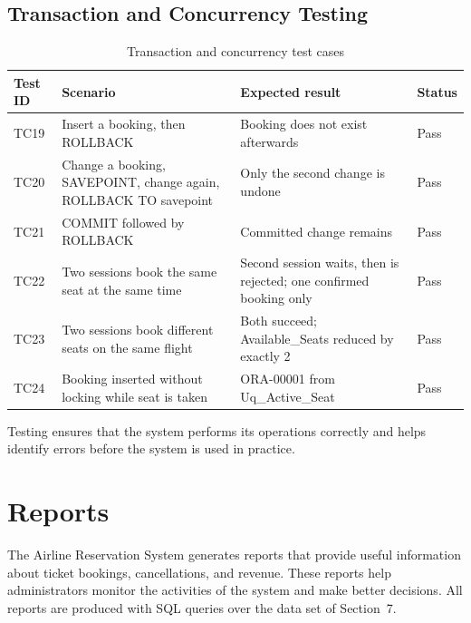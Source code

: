 \documentclass[12pt,a4paper]{article}
\begin{document}
\subsection{Transaction and Concurrency Testing}
\begin{table}[H]
\centering\small
\begin{tabularx}{\textwidth}{l X X l}
\toprule
\textbf{Test ID} & \textbf{Scenario} & \textbf{Expected result} & \textbf{Status}\\
\midrule
TC19 & Insert a booking, then ROLLBACK & Booking does not exist afterwards & Pass\\
TC20 & Change a booking, SAVEPOINT, change again, ROLLBACK TO savepoint & Only the second change is undone & Pass\\
TC21 & COMMIT followed by ROLLBACK & Committed change remains & Pass\\
TC22 & Two sessions book the same seat at the same time & Second session waits, then is rejected; one confirmed booking only & Pass\\
TC23 & Two sessions book different seats on the same flight & Both succeed; Available_Seats reduced by exactly 2 & Pass\\
TC24 & Booking inserted without locking while seat is taken & ORA-00001 from Uq_Active_Seat & Pass\\
\bottomrule
\end{tabularx}
\caption{Transaction and concurrency test cases}
\end{table}
Testing ensures that the system performs its operations correctly and helps identify errors before the
system is used in practice.

\section{Reports}
The Airline Reservation System generates reports that provide useful information about ticket bookings,
cancellations, and revenue. These reports help administrators monitor the activities of the system and make
better decisions. All reports are produced with SQL queries over the data set of Section~7.
\end{document}
